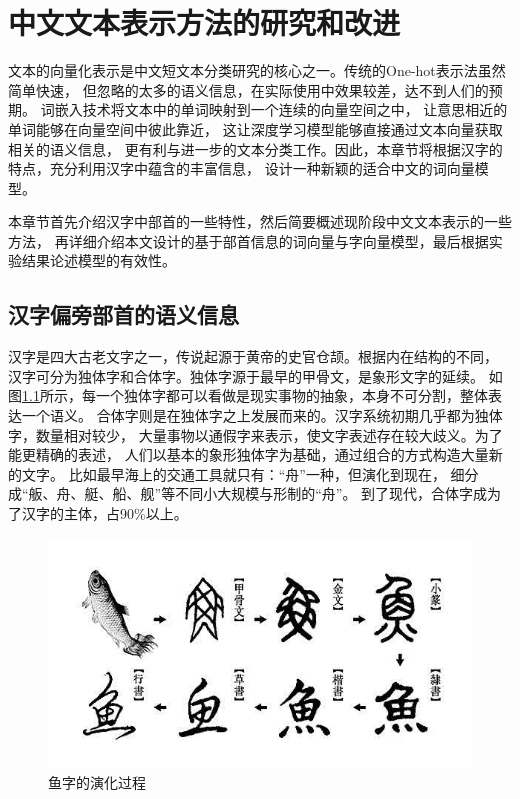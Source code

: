 \chapter{中文文本表示方法的研究和改进}
\label{3_section}
文本的向量化表示是中文短文本分类研究的核心之一。传统的One-hot表示法虽然简单快速，
但忽略的太多的语义信息，在实际使用中效果较差，达不到人们的预期。
词嵌入技术将文本中的单词映射到一个连续的向量空间之中，
让意思相近的单词能够在向量空间中彼此靠近，
这让深度学习模型能够直接通过文本向量获取相关的语义信息，
更有利与进一步的文本分类工作。因此，本章节将根据汉字的特点，充分利用汉字中蕴含的丰富信息，
设计一种新颖的适合中文的词向量模型。

本章节首先介绍汉字中部首的一些特性，然后简要概述现阶段中文文本表示的一些方法，
再详细介绍本文设计的基于部首信息的词向量与字向量模型，最后根据实验结果论述模型的有效性。
\section{汉字偏旁部首的语义信息}
\label{radical_information}
汉字是四大古老文字之一，传说起源于黄帝的史官仓颉。根据内在结构的不同，
汉字可分为独体字和合体字。独体字源于最早的甲骨文，是象形文字的延续。
如图\ref{char_fish}所示，每一个独体字都可以看做是现实事物的抽象，本身不可分割，整体表达一个语义。
合体字则是在独体字之上发展而来的。汉字系统初期几乎都为独体字，数量相对较少，
大量事物以通假字来表示，使文字表述存在较大歧义。为了能更精确的表述，
人们以基本的象形独体字为基础，通过组合的方式构造大量新的文字。
比如最早海上的交通工具就只有：“舟”一种，但演化到现在，
细分成“舨、舟、艇、船、舰”等不同小大规模与形制的“舟”。
到了现代，合体字成为了汉字的主体，占90\%以上。
\begin{figure}[h]
    \includegraphics[scale=0.6]{picture/char.png}
    \caption{鱼字的演化过程}
    \label{char_fish}
\end{figure}

